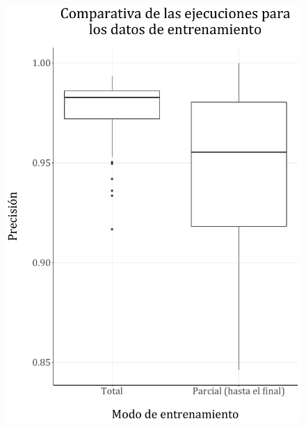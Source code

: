 \documentclass[spanish,a4paper,12pt,twoside]{report}
\begin{document}
  \begin{figure}[H]
    \begin{minipage}{0.49\textwidth}
      \centering
      \includegraphics[width = 1\linewidth]{resources/Fig23_1.pdf}
    \end{minipage}
    \begin{minipage}{0.49\textwidth}
      \centering

\end{minipage}
\end{figure}
\end{document}
